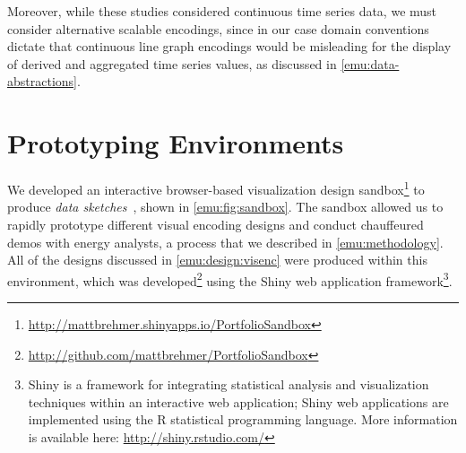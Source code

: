Moreover, while these studies considered continuous time series data, we must consider alternative scalable encodings, since in our case domain conventions dictate that continuous line graph encodings would be misleading for the display of derived and aggregated time series values, as discussed in \autoref{emu:data-abstractions}.


\section{Prototyping Environments}
\label{emu:sandbox}


We developed an interactive browser-based visualization design sandbox\footnote{\url{http://mattbrehmer.shinyapps.io/PortfolioSandbox}} to produce {\it data sketches}~\cite{Lloyd2011}, shown in \autoref{emu:fig:sandbox}. 
The sandbox allowed us to rapidly prototype different visual encoding designs and conduct chauffeured demos with energy analysts, a process that we described in \autoref{emu:methodology}. 
All of the designs discussed in \autoref{emu:design:visenc} were produced within this environment, which was developed\footnote{\url{http://github.com/mattbrehmer/PortfolioSandbox}} using the Shiny web application framework\footnote{Shiny is a framework for integrating statistical analysis and visualization techniques within an interactive web application; Shiny web applications are implemented using the R statistical programming language. More information is available here: \url{http://shiny.rstudio.com/}}.


